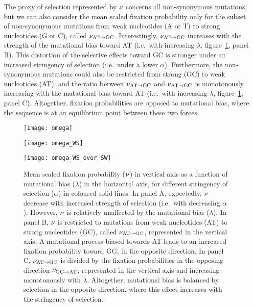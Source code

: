 The proxy of selection represented by $\nu$ concerns all non-synonymous mutations, but we can also consider the mean scaled fixation probability only for the subset of non-synonymous mutations from weak nucleotides (A or T) to strong nucleotides (G or C), called $\nu_{\text{AT} \rightarrow \text{GC}}$.
Interestingly, $\nu_{\text{AT} \rightarrow \text{GC}}$ increases with the strength of the mutational bias toward AT (i.e.~with increasing $\lambda$, figure~\ref{fig:mut-bias-omega-WS}, panel B).
This distortion of the selective effects toward GC is stronger under an increased stringency of selection (i.e.~under a lower $\alpha$).
Furthermore, the non-synonymous mutations could also be restricted from strong (GC) to weak nucleotides (AT), and the ratio between $\nu_{\text{AT} \rightarrow \text{GC}}$ and $\nu_{\text{AT} \rightarrow \text{GC}}$ is monotonously increasing with the mutational bias toward AT (i.e.~with increasing $\lambda$, figure~\ref{fig:mut-bias-omega-WS}, panel C).
Altogether, fixation probabilities are opposed to mutational bias, where the sequence is at an equilibrium point between these two forces.

\begin{figure}[htbp]
    \centering
    \begin{minipage}{0.32\linewidth}
        \texttt{[image: omega]}
    \end{minipage}
    \hfill
    \begin{minipage}{0.32\linewidth}
        \texttt{[image: omega\_WS]}
    \end{minipage}
    \hfill
    \begin{minipage}{0.32\linewidth}
        \texttt{[image: omega\_WS\_over\_SW]}
    \end{minipage}
    \hfill
    \caption[Mean scaled fixation probability as a function of the parameters]{
    Mean scaled fixation probability ($\nu$) in vertical axis as a function of mutational bias ($\lambda$) in the horizontal axis, for different stringency of selection ($\alpha$) in coloured solid lines.
    In panel A, expectedly, $\nu$ decrease with increased strength of selection (i.e.~with decreasing $\alpha$).
    However, $\nu$ is relatively unaffected by the mutational bias ($\lambda$).
    In panel B, $\nu$ is restricted to mutations from weak nucleotides (AT) to strong nucleotides (GC), called $\nu_{\text{AT} \rightarrow \text{GC}}$, represented in the vertical axis.
    A mutational process biased towards AT leads to an increased fixation probability toward GG, in the opposite direction.
    In panel C, $\nu_{\text{AT} \rightarrow \text{GC}}$ is divided by the fixation probabilities in the opposing direction $\nu_{\text{GC} \rightarrow \text{AT}}$, represented in the vertical axis and increasing monotonously with $\lambda$.
    Altogether, mutational bias is balanced by selection in the opposite direction, where this effect increases with the stringency of selection.
    }
    \label{fig:mut-bias-omega-WS}
\end{figure}

